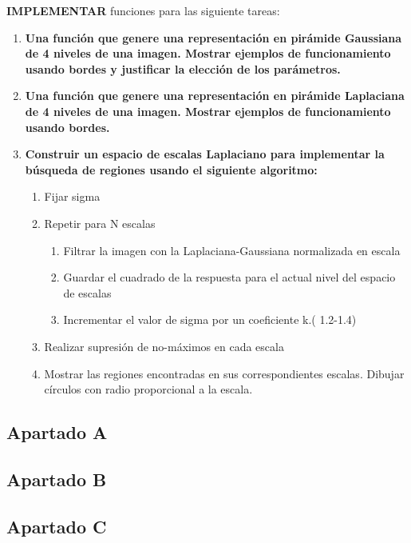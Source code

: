 \documentclass[11pt,a4paper]{article}
\begin{document}
\noindent \textbf{IMPLEMENTAR} funciones para las siguiente tareas:

\begin{enumerate}[label=\textbf{\Alph*)}]
	\item \textbf{Una función que genere una representación en pirámide Gaussiana de 4 niveles de una
	imagen. Mostrar ejemplos de funcionamiento usando bordes y justificar la elección de los parámetros.}
	\item \textbf{Una función que genere una representación en pirámide Laplaciana de 4 niveles de una imagen.
	Mostrar ejemplos de funcionamiento usando bordes.}
	\item \textbf{Construir un espacio de escalas Laplaciano para implementar la búsqueda de regiones usando el siguiente
	algoritmo:}
	\begin{enumerate}[label=\textbf{\alph*.}]
		\item Fijar sigma
		\item Repetir para N escalas
		\begin{enumerate}[label=\roman*.]
			\item Filtrar la imagen con la Laplaciana-Gaussiana normalizada en escala
			\item Guardar el cuadrado de la respuesta para el actual nivel del espacio de escalas
			\item Incrementar el valor de sigma por un coeficiente k.( 1.2-1.4)
		\end{enumerate}
		\item Realizar supresión de no-máximos en cada escala
		\item Mostrar las regiones encontradas en sus correspondientes escalas. Dibujar círculos con radio proporcional a
		la escala.
	\end{enumerate}
\end{enumerate}

\subsection{Apartado A}

\subsection{Apartado B}

\subsection{Apartado C}
\end{document}
